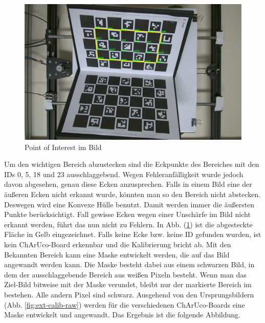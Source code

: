 		\begin{figure}[h]
			\centering
			\includegraphics[width=0.8\linewidth]{img/hauptteil/ext-calib/charuco_convex_hull_primary.png}
			\caption{Point of Interest im Bild}
			\label{fig:ext-calib-hull}
		\end{figure}
	
		Um den wichtigen Bereich abzustecken sind die Eckpunkte des Bereiches mit den IDs 0, 5, 18 und 23 ausschlaggebend. Wegen Fehleranfälligkeit wurde jedoch davon abgesehen, genau diese Ecken anzusprechen. Falls in einem Bild eine der äußeren Ecken nicht erkannt wurde, könnten man so den Bereich nicht abstecken. Deswegen wird eine Konvexe Hülle benutzt. Damit werden immer die äußersten Punkte berücksichtigt. Fall gewisse Ecken wegen einer Unschärfe im Bild nicht erkannt werden, führt das nun nicht zu Fehlern. In Abb. (\ref{fig:ext-calib-hull}) ist die abgesteckte Fläche in Gelb eingezeichnet. Falls keine Ecke bzw. keine ID gefunden wurden, ist kein ChArUco-Board erkennbar und die Kalibrierung bricht ab. \newline
		Mit den Bekannten Bereich kann eine Maske entwickelt werden, die auf das Bild angewandt werden kann. Die Maske besteht dabei aus einem schwarzen Bild, in dem der ausschlaggebende Bereich aus weißen Pixeln besteht. Wenn man das Ziel-Bild bitweise mit der Maske verundet, bleibt nur der markierte Bereich im bestehen. Alle andern Pixel sind schwarz. Ausgehend von den Ursprungsbildern (Abb. \ref{fig:ext-calib-raw}) werden für die verschiedenen ChArUco-Boards eine Maske entwickelt und angewandt. Das Ergebnis ist die folgende Abbildung.
		
